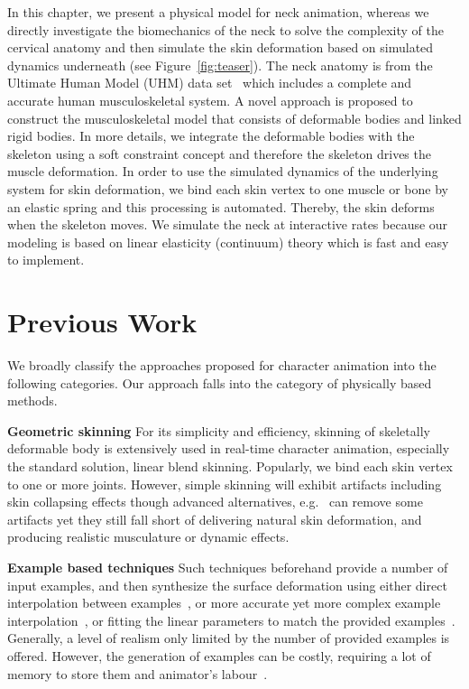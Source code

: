 In this chapter, we present a physical model for neck animation, whereas we directly investigate the biomechanics of the neck to solve the complexity of the cervical anatomy and then simulate the skin deformation based on simulated dynamics underneath (see Figure~\ref{fig:teaser}). The neck anatomy is from the Ultimate Human Model (UHM) data set~\cite{www:UHM} which includes a complete and accurate human musculoskeletal system. A novel approach is proposed to construct the musculoskeletal model that consists of deformable bodies and linked rigid bodies. In more details, we integrate the deformable bodies with the skeleton using a soft constraint concept and therefore the skeleton drives the muscle deformation. In order to use the simulated dynamics of the underlying system for skin deformation, we bind each skin vertex to one muscle or
bone by an elastic spring and this processing is automated. Thereby, the skin deforms when the skeleton moves. We simulate the neck at interactive rates because our modeling is based on linear elasticity (continuum) theory which is fast and easy to implement.

\section{Previous Work}
\label{sec:previous}
We broadly classify the approaches proposed for character animation into the following categories. Our approach falls into the category of physically based methods.

\textbf{Geometric skinning}
For its simplicity and efficiency, skinning of skeletally deformable
body is extensively used in real-time character animation, especially the standard solution, linear blend skinning. Popularly, we bind each skin vertex to one or more joints. However, simple skinning will exhibit artifacts including skin collapsing effects though advanced alternatives, e.g.~\cite{Kavan:2007:SDQ} can remove some artifacts yet they still fall short of delivering natural skin deformation, and producing realistic musculature or dynamic effects.

\textbf{Example based techniques}
Such techniques beforehand provide a number of input examples,
and then synthesize the surface deformation using either direct interpolation between examples~\cite{Lewis:2000:PSD}, or more accurate yet more complex example interpolation~\cite{Rhee:2006:real}, or fitting the linear parameters to match the provided examples~\cite{Mohr:2003:BEA}. Generally, a level of realism only limited by the number of provided examples is offered. However, the generation of examples can be costly, requiring a lot of memory to store them and animator's labour~\cite{Lewis:2000:PSD}.


